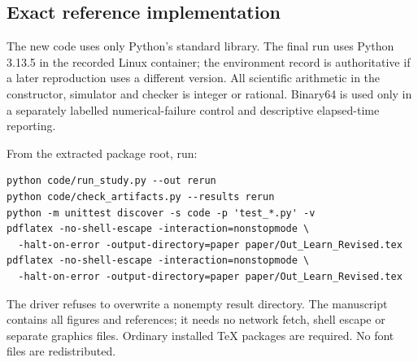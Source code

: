 \documentclass[11pt,letterpaper]{article}
\theoremstyle{definition}\newtheorem{definition}[theorem]{Definition}
\theoremstyle{remark}\newtheorem{remark}[theorem]{Remark}
\begin{document}
\subsection{Exact reference implementation}
The new code uses only Python's standard library. The final run uses Python 3.13.5 in the recorded Linux container; the environment record is authoritative if a later reproduction uses a different version. All scientific arithmetic in the constructor, simulator and checker is integer or rational. Binary64 is used only in a separately labelled numerical-failure control and descriptive elapsed-time reporting.

From the extracted package root, run:
\begin{verbatim}
python code/run_study.py --out rerun
python code/check_artifacts.py --results rerun
python -m unittest discover -s code -p 'test_*.py' -v
pdflatex -no-shell-escape -interaction=nonstopmode \
  -halt-on-error -output-directory=paper paper/Out_Learn_Revised.tex
pdflatex -no-shell-escape -interaction=nonstopmode \
  -halt-on-error -output-directory=paper paper/Out_Learn_Revised.tex
\end{verbatim}
The driver refuses to overwrite a nonempty result directory. The manuscript contains all figures and references; it needs no network fetch, shell escape or separate graphics files. Ordinary installed TeX packages are required. No font files are redistributed.
\end{document}
